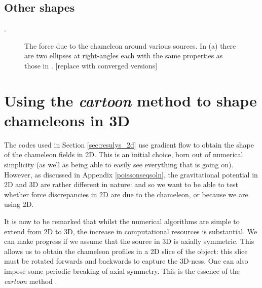 \documentclass[a4paper, 12pt]{article}
\numberwithin{equation}{section}
\newcommand{\note}[1]{{\color{blue}[#1]}}
\begin{document}
\subsection{Other shapes}
.

\begin{figure}[!t]
      \begin{center}
      \end{center}
\caption{ The force due to the chameleon around various sources. In (a) there are two ellipses at right-angles each with the same properties as those in .  \note{replace with converged versions}}\label{fig:varioushapes}
\end{figure}

\section{Using the \textit{cartoon} method to shape chameleons in 3D}
The codes used in Section \ref{sec:resulys_2d} use gradient flow to obtain the shape of the chameleon fields in 2D. This is an initial choice, born out of numerical simplicity (as well as being able to easily see everything that is going on). However, as discussed in Appendix \ref{poissonseqsoln}, the gravitational potential in 2D and 3D are rather different in nature: and so we want to be able to test whether force discrepancies in 2D are due to the chameleon, or because we are using 2D. 

It is now to be remarked that whilst the numerical algorithms are simple to extend from 2D to 3D, the increase in computational resources is substantial. We can make progress if we assume that the source in 3D is axially symmetric. This allows us to obtain the chameleon profiles in a 2D slice of the object: this slice must be rotated forwards and backwards to capture the 3D-ness. One can also impose some periodic breaking of axial symmetry. This is the essence of the \textit{cartoon} method \cite{Alcubierre:1999ab}. 
\end{document}
